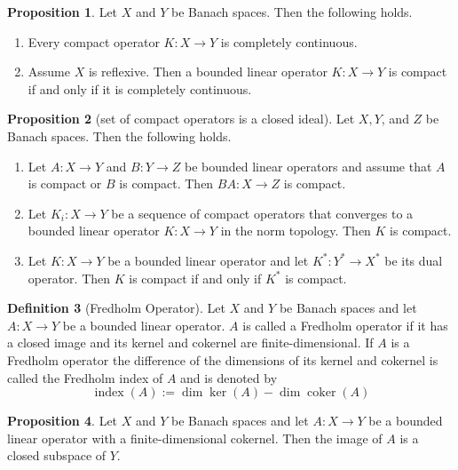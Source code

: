 \documentclass[12pt,a4paper]{book}
\newenvironment{enu}{\begin{enumerate}[(1)]}{\end{enumerate}}
\theoremstyle{definition}
\newtheorem{defn}{Definition}[section]
\newtheorem{prop}[defn]{Proposition}
\begin{document}
\begin{prop}
    Let $X$ and $Y$ be Banach spaces. Then the following holds.
\begin{enu} 
    \item Every compact operator $K: X \rightarrow Y$ is completely continuous.
    \item Assume $X$ is reflexive. Then a bounded linear operator $K: X \rightarrow Y$ is compact if and only if it is completely continuous.
\end{enu}
\end{prop}
\begin{prop}[set of compact operators is a closed ideal]
    Let $X, Y$, and $Z$ be Banach spaces. Then the following holds.
\begin{enu} 
    \item Let $A: X \rightarrow Y$ and $B: Y \rightarrow Z$ be bounded linear operators and assume that $A$ is compact or $B$ is compact. Then $B A: X \rightarrow Z$ is compact.
    \item Let $K_i: X \rightarrow Y$ be a sequence of compact operators that converges to a bounded linear operator $K: X \rightarrow Y$ in the norm topology. Then $K$ is compact.
    \item Let $K: X \rightarrow Y$ be a bounded linear operator and let $K^*: Y^* \rightarrow X^*$ be its dual operator. Then $K$ is compact if and only if $K^*$ is compact.
\end{enu}
\end{prop}
\begin{defn}[Fredholm Operator]
    Let $X$ and $Y$ be Banach spaces and let $A: X \rightarrow Y$ be a bounded linear operator. 
    $A$ is called a Fredholm operator if it has a closed image and its kernel and cokernel are finite-dimensional. If $A$ is a Fredholm operator the difference of the dimensions of its kernel and cokernel is called the Fredholm index of $A$ and is denoted by
    $$
    \operatorname{index}(A):=\operatorname{dim} \operatorname{ker}(A)-\operatorname{dim} \operatorname{coker}(A)
    $$
\end{defn}
\begin{prop}
    Let $X$ and $Y$ be Banach spaces and let $A: X \rightarrow Y$ be a bounded linear operator with a finite-dimensional cokernel. Then the image of $A$ is a closed subspace of $Y$.
\end{prop}
\end{document}
